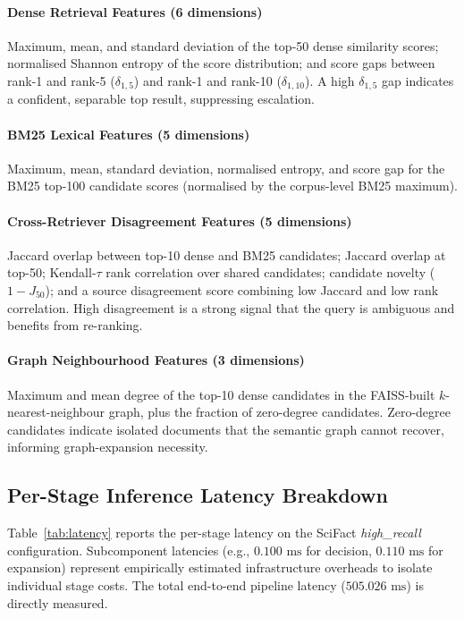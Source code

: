\documentclass[journal]{IEEEtran}
\begin{document}
\paragraph{Dense Retrieval Features (6 dimensions)}
Maximum, mean, and standard deviation of the top-50 dense
similarity scores; normalised Shannon entropy of the score
distribution; and score gaps between rank-1 and rank-5 ($\delta_{1,5}$)
and rank-1 and rank-10 ($\delta_{1,10}$). A high $\delta_{1,5}$ gap
indicates a confident, separable top result, suppressing escalation.

\paragraph{BM25 Lexical Features (5 dimensions)}
Maximum, mean, standard deviation, normalised entropy, and score
gap for the BM25 top-100 candidate scores (normalised by the
corpus-level BM25 maximum).

\paragraph{Cross-Retriever Disagreement Features (5 dimensions)}
Jaccard overlap between top-10 dense and BM25 candidates;
Jaccard overlap at top-50; Kendall-$\tau$ rank correlation over
shared candidates; candidate novelty ($1 - J_{50}$); and a source
disagreement score combining low Jaccard and low rank correlation.
High disagreement is a strong signal that the query is
ambiguous and benefits from re-ranking.

\paragraph{Graph Neighbourhood Features (3 dimensions)}
Maximum and mean degree of the top-10 dense candidates in the
FAISS-built $k$-nearest-neighbour graph, plus the fraction of
zero-degree candidates. Zero-degree candidates indicate isolated
documents that the semantic graph cannot recover, informing
graph-expansion necessity.

\subsection{Per-Stage Inference Latency Breakdown}
\label{sec:latency}

Table~\ref{tab:latency} reports the per-stage latency
on the SciFact \textit{high\_recall} configuration.
Subcomponent latencies (e.g., $0.100\text{ ms}$ for decision, $0.110\text{ ms}$ for expansion) represent empirically estimated infrastructure overheads to isolate individual stage costs. The total end-to-end pipeline latency ($505.026\text{ ms}$) is directly measured.
\end{document}
